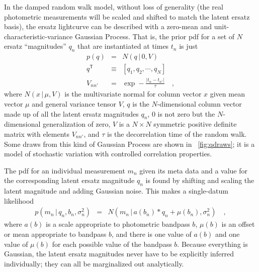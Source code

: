\documentclass[letterpaper,12pt,preprint]{aastex}
\newcommand{\given}{\,|\,}
\newcommand{\transpose}[1]{{#1}^{\mathsf{T}}}
\begin{document}
In the damped random walk model, without loss of generality (the real
photometric measurements will be scaled and shifted to match the
latent ersatz basis), the ersatz lightcurve can be described with a
zero-mean and unit-characteristic-variance Gaussian Process.  That is,
the prior pdf for a set of $N$ ersatz ``magnitudes'' $q_n$ that are
instantiated at times $t_n$ is just
\begin{eqnarray}
p(q) &=& N(q\given 0,V)
\\
\transpose{q} &\equiv& [q_1, q_2, \cdots , q_N]
\\
V_{nn'} &=& \exp -\frac{|t_n - t_{n'}|}{\tau}
\quad ,
\end{eqnarray}
where $N(x\given\mu,V)$ is the multivariate normal for column vector
$x$ given mean vector $\mu$ and general variance tensor $V$, $q$ is
the $N$-dimensional column vector made up of all the latent ersatz
magnitudes $q_n$, $0$ is not zero but the $N$-dimensional
generalization of zero, $V$ is a $N\times N$ symmetric positive
definite matrix with elements $V_{nn'}$, and $\tau$ is the
decorrelation time of the random walk.  Some draws from this kind of
Gaussian Process are shown in \figurename~\ref{fig:qdraws}; it is a
model of stochastic variation with controlled correlation properties.

The pdf for an individual measurement $m_n$ given its meta data and a
value for the corresponding latent ersatz magnitude $q_n$ is found by
shifting and scaling the latent magnitude and adding Gaussian noise.
This makes a single-datum likelihood
\begin{eqnarray}
p(m_n\given q_n,b_n,\sigma_n^2) &=& N(m_n\given a(b_n) * q_n + \mu(b_n), \sigma_n^2)
\quad ,
\end{eqnarray}
where $a(b)$ is a scale appropriate to photometric bandpass $b$,
$\mu(b)$ is an offset or mean appropriate to bandpass $b$, and there
is one value of $a(b)$ and one value of $\mu(b)$ for each possible
value of the bandpass $b$.  Because everything is Gaussian, the latent
ersatz magnitudes never have to be explicitly inferred individually;
they can all be marginalized out analytically.
\end{document}
